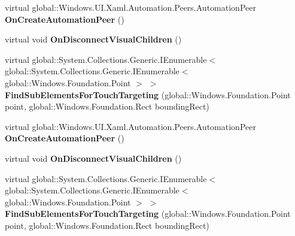 \begin{DoxyCompactItemize}
\item 
\mbox{\label{class_windows_1_1_u_i_1_1_xaml_1_1_u_i_element_a97f2f4d73cda61ba80c255fd0ba6fa23}} 
virtual global\+::\+Windows.\+U\+I.\+Xaml.\+Automation.\+Peers.\+Automation\+Peer {\bfseries On\+Create\+Automation\+Peer} ()
\item 
\mbox{\label{class_windows_1_1_u_i_1_1_xaml_1_1_u_i_element_a044b9e7fd69b9591b9342e63f4414a7f}} 
virtual void {\bfseries On\+Disconnect\+Visual\+Children} ()
\item 
\mbox{\label{class_windows_1_1_u_i_1_1_xaml_1_1_u_i_element_a706c639a70707ea7a264a54ff755ff5c}} 
virtual global\+::\+System.\+Collections.\+Generic.\+I\+Enumerable$<$ global\+::\+System.\+Collections.\+Generic.\+I\+Enumerable$<$ global\+::\+Windows.\+Foundation.\+Point $>$ $>$ {\bfseries Find\+Sub\+Elements\+For\+Touch\+Targeting} (global\+::\+Windows.\+Foundation.\+Point point, global\+::\+Windows.\+Foundation.\+Rect bounding\+Rect)
\item 
\mbox{\label{class_windows_1_1_u_i_1_1_xaml_1_1_u_i_element_a97f2f4d73cda61ba80c255fd0ba6fa23}} 
virtual global\+::\+Windows.\+U\+I.\+Xaml.\+Automation.\+Peers.\+Automation\+Peer {\bfseries On\+Create\+Automation\+Peer} ()
\item 
\mbox{\label{class_windows_1_1_u_i_1_1_xaml_1_1_u_i_element_a044b9e7fd69b9591b9342e63f4414a7f}} 
virtual void {\bfseries On\+Disconnect\+Visual\+Children} ()
\item 
\mbox{\label{class_windows_1_1_u_i_1_1_xaml_1_1_u_i_element_a706c639a70707ea7a264a54ff755ff5c}} 
virtual global\+::\+System.\+Collections.\+Generic.\+I\+Enumerable$<$ global\+::\+System.\+Collections.\+Generic.\+I\+Enumerable$<$ global\+::\+Windows.\+Foundation.\+Point $>$ $>$ {\bfseries Find\+Sub\+Elements\+For\+Touch\+Targeting} (global\+::\+Windows.\+Foundation.\+Point point, global\+::\+Windows.\+Foundation.\+Rect bounding\+Rect)
\item 
\mbox{\label{class_windows_1_1_u_i_1_1_xaml_1_1_u_i_element_a97f2f4d73cda61ba80c255fd0ba6fa23}} 

\end{DoxyCompactItemize}
